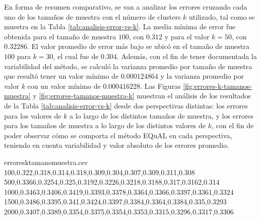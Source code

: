 \bigskip En forma de resumen comparativo, se van a analizar los errores cruzando cada uno de los tamaños de muestra con el número de clusters \(k\) utilizado, tal como se muestra en la Tabla \ref{tab:analisis-error-vs-k}. La media mínima de error fue obtenida para el tamaño de muestra \(100\), con \(0.312\) y para el valor \(k = 50\), con \(0.32286\). El valor promedio de error más bajo se ubicó en el tamaño de muestra \(100\) para \(k = 30\), el cual fue de \(0.304\). Además, con el fin de tener documentada la variabilidad del método, se calculó la varianza promedio por tamaño de muestra que resultó tener un valor mínimo de \(0.000124864\) y la varianza promedio por valor \(k\) con un valor mínimo de \(0.000416228\). Las Figuras \ref{fig:errores-k-tamanos-muestra} y \ref{fig:errores-tamanos-muestra-k} muestran el análisis de los resultados de la Tabla \ref{tab:analisis-error-vs-k} desde dos perspectivas distintas: los errores para los valores de \(k\) a lo largo de los distintos tamaños de muestra, y los errores para los tamaños de muestra a lo largo de los distintos valores de \(k\), con el fin de poder observar cómo se comporta el método EQuAL en cada perspectiva, teniendo en cuenta variabilidad y valor absoluto de los errores promedio.

\begin{filecontents*}{erroresktamanomuestra.csv}
100,0.322,0.318,0.314,0.318,0.309,0.304,0.307,0.309,0.311,0.308
500,0.3366,0.3254,0.325,0.3192,0.3226,0.3218,0.3188,0.317,0.3162,0.314
1000,0.3463,0.3406,0.3419,0.3393,0.3378,0.3364,0.3366,0.3397,0.3361,0.3324
1500,0.3486,0.3395,0.341,0.3424,0.3397,0.3384,0.3364,0.3384,0.335,0.3293
2000,0.3407,0.3389,0.3354,0.3375,0.3354,0.3353,0.3315,0.3296,0.3317,0.3306
\end{filecontents*}


